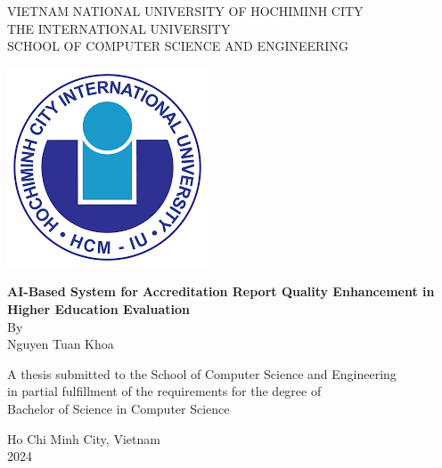 \begin{titlepage}
    \begin{center}
        \vspace{1.0cm}
        
        \large
        VIETNAM NATIONAL UNIVERSITY OF HOCHIMINH CITY\\
        \large
        THE INTERNATIONAL UNIVERSITY\\
        \large
        SCHOOL OF COMPUTER SCIENCE AND ENGINEERING
        
        
        \vspace{3cm}
        \includegraphics[scale=0.8]{images/download.png}
        \vspace{3cm}
        
        \Huge
        \textbf{AI-Based System for Accreditation Report Quality Enhancement in Higher Education Evaluation}\\
        
        \Large
        By\\
        {Nguyen Tuan Khoa}
            
        \vspace{2.0cm}
        
            
        
            
        \large
        A thesis submitted to the School of Computer Science and Engineering \\
        in partial fulfillment of the requirements for the degree of \\
        Bachelor of Science in Computer Science
        
        \vfill
        Ho Chi Minh City, Vietnam\\
        2024
        
    \end{center}
\end{titlepage}